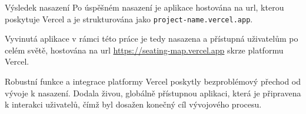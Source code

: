 \begin{subsection}{Výsledek nasazení}
    \label{subsec:implementace-vysledek-nasazeni}
    Po úspěšném nasazení je aplikace hostována na \acs{url}, kterou poskytuje Vercel a je strukturována jako \texttt{project-name.vercel.app}.

    Vyvinutá aplikace v rámci této práce je tedy nasazena a přístupná uživatelům po celém světě, hostována na \ac{url} \url{https://seating-map.vercel.app} skrze platformu Vercel.

    Robustní funkce a integrace platformy Vercel poskytly bezproblémový přechod od vývoje k nasazení.
    Dodala živou, globálně přístupnou aplikaci, která je připravena k interakci uživatelů, čímž byl dosažen konečný cíl vývojového procesu.
\end{subsection}
